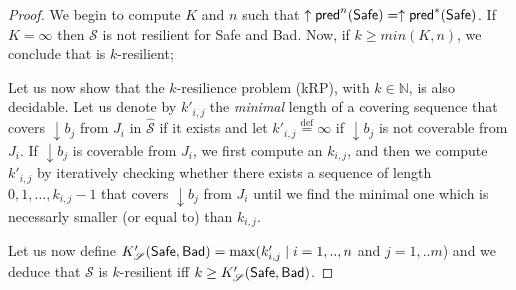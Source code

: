 	\begin{proof}

We begin to compute $K$ and $n$ such that $ \uparrow \textsf{pred}^n(\textsf{Safe})=  \uparrow \textsf{pred}^*(\textsf{Safe})$.
If $K=\infty$ then $\mathscr{S}$ is not resilient for Safe and Bad.
Now, if $k \geq min(K,n)$, we conclude that is $k$-resilient; 
\fi

Let us now show that the $k$-resilience problem (kRP), with $k \in \mathbb{N}$, is also decidable.
Let us denote by $k'_{i,j}$ the \emph{minimal} length of a covering sequence that covers $\downarrow b_j$ from $J_i$ in $\hat{\mathscr{S}}$ if it exists and let $k'_{i,j}\stackrel{\text{def}}{=}\infty$ if $\downarrow b_j$ is not coverable from $J_i$. 
If $\downarrow b_j$ is coverable from $J_i$, we first compute an $k_{i,j}$, and then we compute $k'_{i,j}$ by iteratively checking whether there exists a sequence of length $0,1,...,k_{i,j}-1$ that covers $\downarrow b_j$ from $J_i$ until we find the minimal one which is necessarly smaller (or equal to) than $k_{i,j}$.

Let us now define $K'_{\mathscr{S}}(\textsf{Safe},\textsf{Bad})=\max(k'_{i,j} \mid i=1,..,n$ and $j= 1,..m$) and we deduce that  $\mathscr{S}$ is $k$-resilient iff $k \geq K'_{\mathscr{S}}(\textsf{Safe},\textsf{Bad})$.

\end{proof}

%





